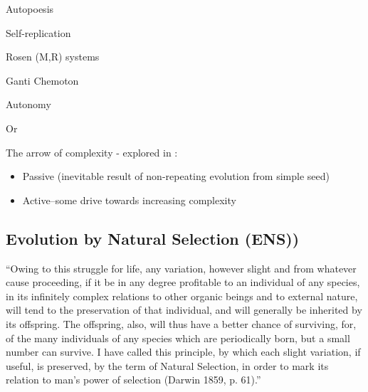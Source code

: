 Autopoesis

Self-replication

Rosen (M,R) systems

Ganti Chemoton

Autonomy

Or 

The arrow of complexity - explored in \autocite{Miconi:2008cy}:
\begin{itemize}
	\item Passive (inevitable result of non-repeating evolution from simple seed)
	\item Active--some drive towards increasing complexity
\end{itemize}

\subsection{Evolution by Natural Selection (ENS))}\label{ens-evolution-by-natural-selection}

``Owing to this struggle for life, any variation, however slight and
from whatever cause proceeding, if it be in any degree profitable to
an individual of any species, in its infinitely complex relations to
other organic beings and to external nature, will tend to the
preservation of that individual, and will generally be inherited by
its offspring. The offspring, also, will thus have a better chance
of surviving, for, of the many individuals of any species which are
periodically born, but a small number can survive. I have called
this principle, by which each slight variation, if useful, is
preserved, by the term of Natural Selection, in order to mark its
relation to man's power of selection (Darwin 1859, p. 61).'' \autocite{Griesemer2005}

